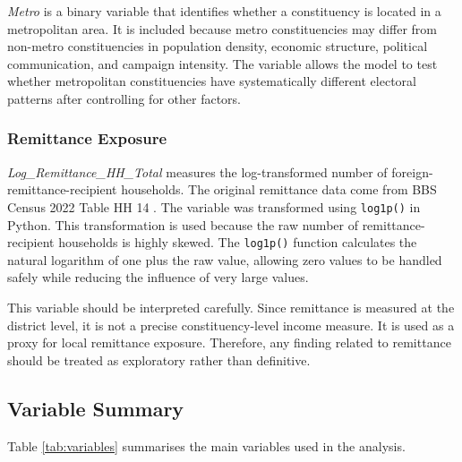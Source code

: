 \documentclass[12pt,a4paper]{article}
\begin{document}
\textit{Metro} is a binary variable that identifies whether a constituency is located in a metropolitan area. It is included because metro constituencies may differ from non-metro constituencies in population density, economic structure, political communication, and campaign intensity. The variable allows the model to test whether metropolitan constituencies have systematically different electoral patterns after controlling for other factors.

\subsubsection{Remittance Exposure}

\textit{Log\_Remittance\_HH\_Total} measures the log-transformed number of foreign-remittance-recipient households. The original remittance data come from BBS Census 2022 Table HH 14 \citep{bbs2023}. The variable was transformed using \texttt{log1p()} in Python. This transformation is used because the raw number of remittance-recipient households is highly skewed. The \texttt{log1p()} function calculates the natural logarithm of one plus the raw value, allowing zero values to be handled safely while reducing the influence of very large values.

This variable should be interpreted carefully. Since remittance is measured at the district level, it is not a precise constituency-level income measure. It is used as a proxy for local remittance exposure. Therefore, any finding related to remittance should be treated as exploratory rather than definitive.

\subsection{Variable Summary}

Table \ref{tab:variables} summarises the main variables used in the analysis.
\end{document}
